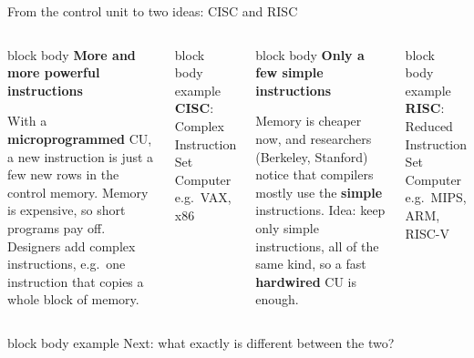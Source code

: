 \documentclass[aspectratio=169,10pt]{beamer}
\newcommand{\keymsg}[1]{%
  \begin{beamercolorbox}[rounded=true,sep=0.1cm,wd=\textwidth]{block body example}
    \centering\footnotesize #1
  \end{beamercolorbox}}
\begin{document}
\begin{frame}{From the control unit to two ideas: CISC and RISC}
  \begin{center}
  \end{center}
  \vspace{-0.2cm}
  \begin{columns}[T,onlytextwidth]
      \begin{beamercolorbox}[rounded=true,sep=0.12cm,wd=\linewidth]{block body}
        \centering\small\textbf{More and more powerful instructions}\\[0.08cm]
        \raggedright\footnotesize
        With a \textbf{microprogrammed} CU, a new instruction is just a few new rows in the control memory.
        Memory is expensive, so short programs pay off. Designers add complex instructions,
        e.g.\ one instruction that copies a whole block of memory.
      \end{beamercolorbox}
      \vspace{0.08cm}
      \begin{beamercolorbox}[rounded=true,sep=0.1cm,wd=\linewidth]{block body example}
        \centering\footnotesize \textbf{CISC}: Complex Instruction Set Computer\\ e.g.\ VAX, x86
      \end{beamercolorbox}
      \begin{beamercolorbox}[rounded=true,sep=0.12cm,wd=\linewidth]{block body}
        \centering\small\textbf{Only a few simple instructions}\\[0.08cm]
        \raggedright\footnotesize
        Memory is cheaper now, and researchers (Berkeley, Stanford) notice that compilers mostly use the
        \textbf{simple} instructions. Idea: keep only simple instructions, all of the same kind,
        so a fast \textbf{hardwired} CU is enough.
      \end{beamercolorbox}
      \vspace{0.08cm}
      \begin{beamercolorbox}[rounded=true,sep=0.1cm,wd=\linewidth]{block body example}
        \centering\footnotesize \textbf{RISC}: Reduced Instruction Set Computer\\ e.g.\ MIPS, ARM, RISC-V
      \end{beamercolorbox}
  \end{columns}
  \vfill
  \keymsg{Next: what exactly is different between the two?}
\end{frame}
\end{document}
